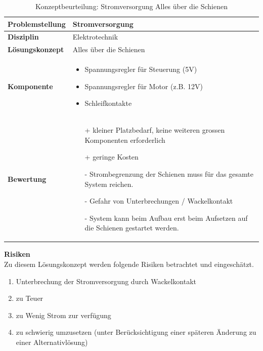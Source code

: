 \documentclass[../../main.tex]{subfiles}
\begin{document}
    \begin{flushleft}
        \begin{table}[H]
        \begin{tabular}{ | l | p{11cm} |}
        \hline
        \textbf{Problemstellung} & Stromversorgung \\ \hline
        \textbf{Disziplin} & Elektrotechnik \\ \hline
        \textbf{Lösungskonzept} & Alles über die Schienen\\ \hline
        \textbf{Komponente} & \begin{itemize}
            \item Spannungsregler für Steuerung (5V)
            \item Spannungsregler für Motor (z.B. 12V)
            \item Schleifkontakte
            \end{itemize}\\ \hline
        \textbf{Bewertung} &  \begin{itemize}
                                \item[+] kleiner Platzbedarf, keine weiteren grossen Komponenten erforderlich
                                \item[+] geringe Kosten
                                \item[-] Strombegrenzung der Schienen muss für das gesamte System reichen.
                                \item[-] Gefahr von Unterbrechungen / Wackelkontakt
                                \item[-] System kann beim Aufbau erst beim Aufsetzen auf die Schienen gestartet werden. 
                              \end{itemize} \\ \hline
        \end{tabular}
        \caption{Konzeptbeurteilung: Stromversorgung Alles über die Schienen}
        \label{tab:strom_konzept_schienen}
    \end{table}
    \end{flushleft}

    \textbf{Risiken}\\
    Zu diesem Lösungskonzept werden folgende Risiken betrachtet und eingeschätzt.
    \begin{enumerate}[I]
        \item Unterbrechung der Stromversorgung durch Wackelkontakt
        \item zu Teuer
        \item zu Wenig Strom zur verfügung
        \item zu schwierig umzusetzen (unter Berücksichtigung einer späteren Änderung zu einer Alternativlösung)
    \end{enumerate}
\end{document}
